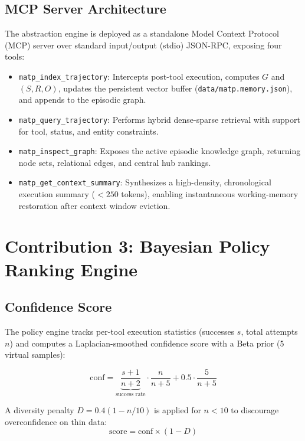 \documentclass[lettersize,journal]{IEEEtran}
\begin{document}
\subsection{MCP Server Architecture}

The abstraction engine is deployed as a standalone Model Context Protocol (MCP) server over standard input/output (stdio) JSON-RPC, exposing four tools:
\begin{itemize}
    \item \texttt{matp\_index\_trajectory}: Intercepts post-tool execution, computes $G$ and $(S, R, O)$, updates the persistent vector buffer (\texttt{data/matp.memory.json}), and appends to the episodic graph.
    \item \texttt{matp\_query\_trajectory}: Performs hybrid dense-sparse retrieval with support for tool, status, and entity constraints.
    \item \texttt{matp\_inspect\_graph}: Exposes the active episodic knowledge graph, returning node sets, relational edges, and central hub rankings.
    \item \texttt{matp\_get\_context\_summary}: Synthesizes a high-density, chronological execution summary ($< 250$ tokens), enabling instantaneous working-memory restoration after context window eviction.
\end{itemize}

\section{Contribution 3: Bayesian Policy Ranking Engine}

\subsection{Confidence Score}

The policy engine tracks per-tool execution statistics (successes $s$, total attempts $n$) and computes a Laplacian-smoothed confidence score with a Beta prior (5 virtual samples):

\begin{equation}
\label{eq:conf}
\text{conf} = \underbrace{\frac{s+1}{n+2}}_{\text{success rate}} \cdot \frac{n}{n+5} + 0.5 \cdot \frac{5}{n+5}
\end{equation}

A diversity penalty $D = 0.4(1 - n/10)$ is applied for $n < 10$ to discourage overconfidence on thin data:
\begin{equation}
\text{score} = \text{conf} \times (1 - D)
\end{equation}
\end{document}
